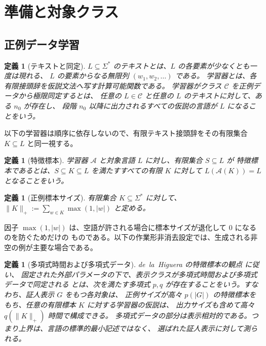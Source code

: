 \documentclass[11pt,a4paper]{ltjsarticle}
\newtheorem{definition}[theorem]{定義}
\theoremstyle{remark}
\begin{document}
\section{準備と対象クラス}
\label{sec:prelim}

\subsection{正例データ学習}

\begin{definition}[テキストと同定]
\(L\subseteq\Sigma^*\) の\emph{テキスト}とは、\(L\) の各要素が少なくとも一度は現れる、
\(L\) の要素からなる無限列 \((w_1,w_2,\ldots)\) である。
学習器とは、各有限接頭辞を仮説文法へ写す計算可能関数である。
学習器がクラス \(\mathcal C\) を正例データから\emph{極限同定する}とは、
任意の \(L\in\mathcal C\) と任意の \(L\) のテキストに対して、ある \(n_0\) が存在し、
段階 \(n_0\) 以降に出力されるすべての仮説の言語が \(L\) になることをいう。
\end{definition}

以下の学習器は順序に依存しないので、有限テキスト接頭辞をその有限集合
\(K\subseteq L\) と同一視する。

\begin{definition}[特徴標本]
学習器 \(\mathcal A\) と対象言語 \(L\) に対し、有限集合 \(S\subseteq L\) が
\emph{特徴標本}であるとは、\(S\subseteq K\subseteq L\) を満たすすべての有限 \(K\) に対して
\(L(\mathcal A(K))=L\) となることをいう。
\end{definition}

\begin{definition}[正例標本サイズ]
有限集合 \(K\subseteq\Sigma^*\) に対して、
\(\|K\|_+:=\sum_{w\in K}\max(1,|w|)\) と定める。
\end{definition}

因子 \(\max(1,|w|)\) は、空語が許される場合に標本サイズが退化して 0 になるのを防ぐためだけの
ものである。以下の作業形非消去設定では、生成される非空の例が主要な場合である。

\begin{definition}[多項式時間および多項式データ]
\label{def:poly-time-data}
de~la~Higuera の特徴標本の観点 \cite{delaHiguera1997,delaHiguera2010} に従い、
固定された外部パラメータの下で、表示クラスが\emph{多項式時間および多項式データで同定される}
とは、次を満たす多項式 \(p,q\) が存在することをいう。すなわち、証人表示 \(G\) をもつ各対象は、
正例サイズが高々 \(p(|G|)\) の特徴標本をもち、任意の有限標本 \(K\) に対する学習器の仮説は、
出力サイズも含めて高々 \(q(\|K\|_+)\) 時間で構成できる。
多項式データの部分は表示相対的である。つまり上界は、言語の標準的最小記述ではなく、
選ばれた証人表示に対して測られる。
\end{definition}
\end{document}
